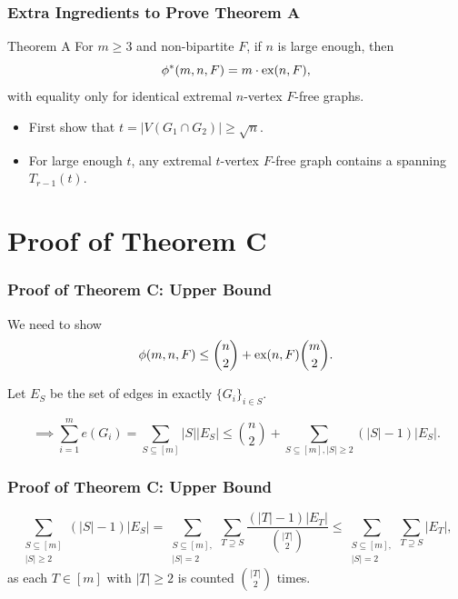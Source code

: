 \documentclass{beamer}
\newcommand*{\ex}{\textnormal{ex}}
\begin{document}




\begin{frame}
  \frametitle{Extra Ingredients to Prove Theorem A}

  \begin{block}{Theorem A}
    For $m \geq 3$ and non-bipartite $F$, if $n$ is large enough, then
    \[
      \phi^*(m, n, F) = m \cdot \ex(n, F),
    \]
    with equality only for identical extremal $n$-vertex $F$-free graphs.
  \end{block}

  \vspace{0.3cm}

  \begin{itemize}
    \item First show that $t = |V(G_1 \cap G_2)| \geq \sqrt{n}$.
    \item For large enough $t$, any extremal $t$-vertex $F$-free graph contains a spanning $T_{r - 1}(t)$.
  \end{itemize}
\end{frame}

\section{Proof of Theorem C}

\begin{frame}
  \frametitle{Proof of Theorem C: Upper Bound}

  We need to show
  \[  
    \phi(m, n ,F) \leq \binom{n}{2} + \ex(n, F)\binom{m}{2}.  
  \]

  \pause
  
  Let $E_S$ be the set of edges in exactly $\{G_i\}_{i \in S}$.

  \pause

  \[
    \implies \sum_{i = 1}^m e(G_i) = \sum_{S \subseteq [m]} |S||E_S| \leq \binom{n}{2} + \sum_{S \subseteq [m], |S| \geq 2} (|S| - 1)|E_S|.
  \]
\end{frame}

\begin{frame}

  \frametitle{Proof of Theorem C: Upper Bound}

  \[
    \sum_{\substack{S \subseteq [m] \\ |S| \geq 2}} (|S| - 1)|E_S| = \sum_{\substack{S \subseteq [m], \\ |S| = 2}} \sum_{T \supseteq S} \frac{(|T| - 1)|E_T|}{\binom{|T|}{2}} \leq \sum_{\substack{S \subseteq [m], \\ |S| = 2}} \sum_{T \supseteq S} |E_T|,
  \]
  as each $T \in [m]$ with $|T| \geq 2$ is counted $\binom{|T|}{2}$ times.
\end{frame}
\end{document}
